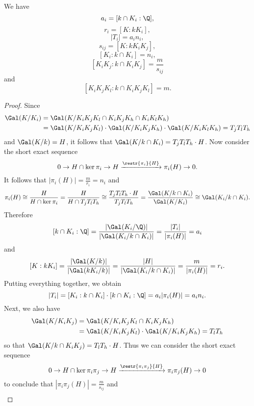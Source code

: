 \begin{prop}\label{degrees}
We have $$a_i=[k\cap K_i:\Q],$$ $$r_i=[K:kK_i],$$ $$|T_i|=a_in_i,$$ $$s_{ij}=[K:kK_iK_j],$$ $$[K_i:k\cap K_i]=n_i,$$ $$[K_iK_j:k\cap K_iK_j]=\frac{m}{s_{ij}}$$ and $$[K_iK_jK_l:k\cap K_iK_jK_l]=m.$$
\end{prop}
\begin{proof}
Since
\begin{equation*}
\begin{split}
\Gal(K/K_i)&=\Gal(K/K_iK_jK_l\cap K_iK_jK_h\cap K_iK_lK_h)\\
&=\Gal(K/K_iK_jK_l)\cdot \Gal(K/K_iK_jK_h)\cdot \Gal(K/K_iK_lK_h)
= T_jT_lT_h
\end{split}
\end{equation*} 
 and $\Gal(K/k)=H$, it follows that $\Gal(K/k\cap K_i)= T_jT_lT_h\cdot H$. Now consider the short exact sequence %
$$0\to H\cap \ker \pi_i\to H \xrightarrow{\restr{\pi_i}{H}} \pi_i(H)\to 0.$$
It follows that $|\pi_i(H)|=\frac{m}{r_i}=n_i$ and $$\pi_i(H)\cong \frac{H}{H\cap \ker \pi_i}=\frac{H}{H\cap T_jT_lT_h}\cong \frac{T_jT_lT_h\cdot H}{T_jT_lT_h}= \frac{\Gal(K/k\cap K_i)}{\Gal(K/K_i)}\cong \Gal(K_i/k\cap K_i).$$
Therefore 
$$[k\cap K_i:\Q]=\frac{|\Gal(K_i/\Q)|}{|\Gal(K_i/k\cap K_i)|}=\frac{|T_i|}{|\pi_i(H)|}=a_i$$
and
$$[K:kK_i]=\frac{|\Gal(K/k)|}{|\Gal(kK_i/k)|}=\frac{|H|}{|\Gal(K_i/k\cap K_i)|}=\frac{m}{|\pi_i(H)|}=r_i.$$
Putting everything together, we obtain $$|T_i|=[K_i:k\cap K_i]\cdot[k\cap K_i:\Q]=a_i|\pi_i(H)|=a_in_i.$$
Next, we also have 
\begin{equation*}
\begin{split}
\Gal(K/K_iK_j)&=\Gal(K/K_iK_jK_l\cap K_iK_jK_h)\\
&=\Gal(K/K_iK_jK_l)\cdot \Gal(K/K_iK_jK_h)= T_lT_h
\end{split}
\end{equation*} 
so that $\Gal(K/k\cap K_iK_j)=T_lT_h\cdot H$. Thus we can consider the short exact sequence 
$$0\to H\cap \ker \pi_i\pi_j\to H \xrightarrow{\restr{\pi_i\pi_j}{H}} \pi_i\pi_j(H)\to 0$$
to conclude that $|\pi_i\pi_j(H)|=\frac{m}{s_{ij}}$ and 
\begin{equation*}
\begin{split}

\end{split}
\end{equation*}
\end{proof}
